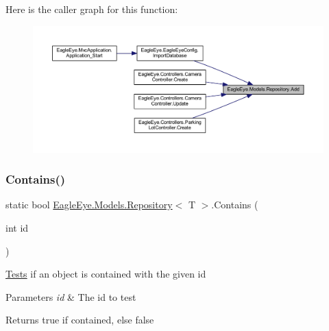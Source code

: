 Here is the caller graph for this function\+:
\nopagebreak
\begin{figure}[H]
\begin{center}
\leavevmode
\includegraphics[width=350pt]{class_eagle_eye_1_1_models_1_1_repository_aca9fded0480d870f0ec7837700243a2b_icgraph}
\end{center}
\end{figure}
\mbox{\label{class_eagle_eye_1_1_models_1_1_repository_ad94aecd681043ac78cd50dcde4aaeb0d}} 
\subsubsection{\texorpdfstring{Contains()}{Contains()}}
{\footnotesize\ttfamily static bool \mbox{\hyperlink{class_eagle_eye_1_1_models_1_1_repository}{Eagle\+Eye.\+Models.\+Repository}}$<$ T $>$.Contains (\begin{DoxyParamCaption}\item[{int}]{id }\end{DoxyParamCaption})\hspace{0.3cm}{\ttfamily [static]}}



\mbox{\hyperlink{namespace_eagle_eye_1_1_tests}{Tests}} if an object is contained with the given id 


\begin{DoxyParams}{Parameters}
{\em id} & The id to test\\
\hline
\end{DoxyParams}
\begin{DoxyReturn}{Returns}
true if contained, else false
\end{DoxyReturn}
\mbox{\label{class_eagle_eye_1_1_models_1_1_repository_ad50f201c8f5f1c7794ddf068ed459854}} 
